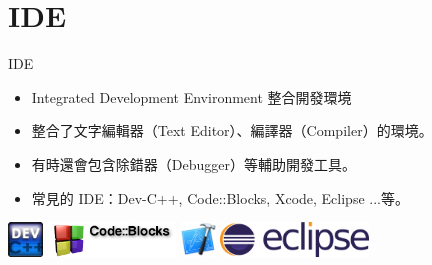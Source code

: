 \documentclass[t]{beamer}
\begin{document}
\section{IDE}
\begin{frame}{IDE}
  \begin{itemize}
    \item Integrated Development Environment 整合開發環境
    \item 整合了文字編輯器（Text Editor）、編譯器（Compiler）的環境。
    \item 有時還會包含除錯器（Debugger）等輔助開發工具。
    \item 常見的 IDE：Dev-C++, Code::Blocks, Xcode, Eclipse ...等。
  \end{itemize}
  \begin{center}
    \includegraphics[height=2.5em]{image/dev.png}
    \hspace{1em}
    \includegraphics[height=2.5em]{image/cb.png}
    \hspace{1em}
    \includegraphics[height=2.5em]{image/xcode.png}
    \hspace{1em}
    \includegraphics[height=2.5em]{image/eclipse.png}
  \end{center}
\end{frame}
\end{document}

